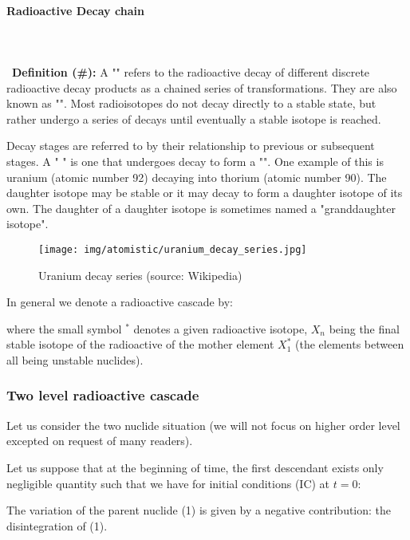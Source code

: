 	\pagebreak
	\paragraph{Radioactive Decay chain}\mbox{}\\\\\
	 \textbf{Definition (\#\mydef):} A "" refers to the radioactive decay of different discrete radioactive decay products as a chained series of transformations. They are also known as "". Most radioisotopes do not decay directly to a stable state, but rather undergo a series of decays until eventually a stable isotope is reached.

	Decay stages are referred to by their relationship to previous or subsequent stages. A " " is one that undergoes decay to form a "". One example of this is uranium (atomic number 92) decaying into thorium (atomic number 90). The daughter isotope may be stable or it may decay to form a daughter isotope of its own. The daughter of a daughter isotope is sometimes named a "granddaughter isotope".
	
	\begin{figure}[H]
		\begin{center}
		\texttt{[image: img/atomistic/uranium\_decay\_series.jpg]}
		\end{center}	
		\caption{Uranium decay series (source: Wikipedia)}
	\end{figure}
	
	In general we denote a radioactive cascade by:
	
	where the small symbol $^{*}$ denotes a given radioactive isotope, $X_n$ being the final stable isotope of the radioactive of the mother element $X_1^{*}$ (the elements between all being unstable nuclides).
	
	\subsubsection{Two level radioactive cascade}
	Let us consider the two nuclide situation (we will not focus on higher order level excepted on request of many readers). 

	Let us suppose that at the beginning of time, the first descendant exists only negligible quantity such that we have for initial conditions (IC) at $t=0$:
	
	The variation of the parent nuclide (1) is given by a negative contribution: the disintegration of (1).

